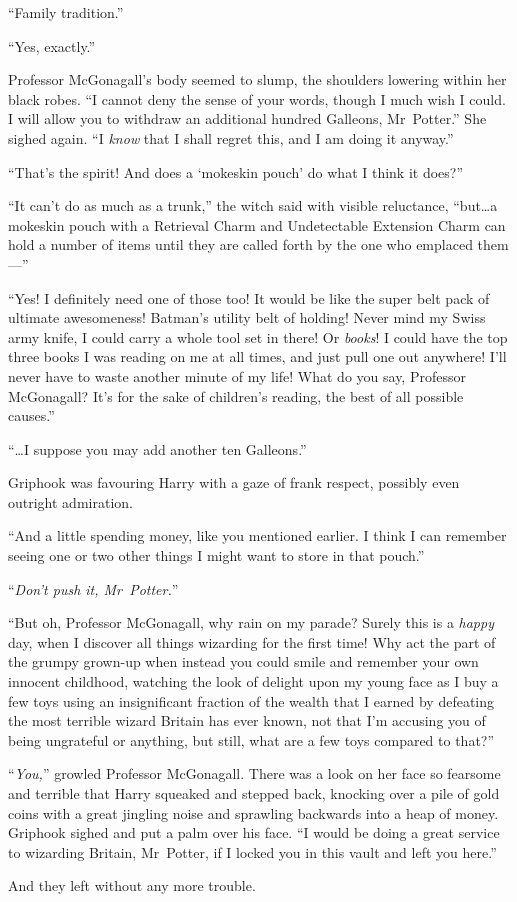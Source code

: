 “Family tradition.”

“Yes, exactly.”

Professor McGonagall’s body seemed to slump, the shoulders lowering within her black robes. “I cannot deny the sense of your words, though I much wish I could. I will allow you to withdraw an additional hundred Galleons, Mr~Potter.” She sighed again. “I \emph{know} that I shall regret this, and I am doing it anyway.”

“That’s the spirit! And does a ‘mokeskin pouch’ do what I think it does?”

“It can’t do as much as a trunk,” the witch said with visible reluctance, “but…a mokeskin pouch with a Retrieval Charm and Undetectable Extension Charm can hold a number of items until they are called forth by the one who emplaced them—”

“Yes! I definitely need one of those too! It would be like the super belt pack of ultimate awesomeness! Batman’s utility belt of holding! Never mind my Swiss army knife, I could carry a whole tool set in there! Or \emph{books}! I could have the top three books I was reading on me at all times, and just pull one out anywhere! I’ll never have to waste another minute of my life! What do you say, Professor McGonagall? It’s for the sake of children’s reading, the best of all possible causes.”

“…I suppose you may add another ten Galleons.”

Griphook was favouring Harry with a gaze of frank respect, possibly even outright admiration.

“And a little spending money, like you mentioned earlier. I think I can remember seeing one or two other things I might want to store in that pouch.”

“\emph{Don’t push it, Mr~Potter.}”

“But oh, Professor McGonagall, why rain on my parade? Surely this is a \emph{happy} day, when I discover all things wizarding for the first time! Why act the part of the grumpy grown-up when instead you could smile and remember your own innocent childhood, watching the look of delight upon my young face as I buy a few toys using an insignificant fraction of the wealth that I earned by defeating the most terrible wizard Britain has ever known, not that I’m accusing you of being ungrateful or anything, but still, what are a few toys compared to that?”

“\emph{You,}” growled Professor McGonagall. There was a look on her face so fearsome and terrible that Harry squeaked and stepped back, knocking over a pile of gold coins with a great jingling noise and sprawling backwards into a heap of money. Griphook sighed and put a palm over his face. “I would be doing a great service to wizarding Britain, Mr~Potter, if I locked you in this vault and left you here.”

And they left without any more trouble.

